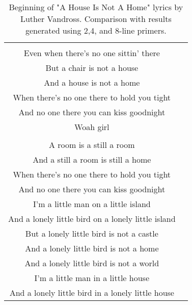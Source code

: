 \begin{table}[!h]
\begin{tabular}{cc}
\begin{minipage}[t]{0.47\textwidth}
	 A chair is still a chair\\
	 Even when there's no one sittin' there\\
	 But a chair is not a house\\
	 And a house is not a home\\
	 When there's no one there to hold you tight\\
	 And no one there you can kiss goodnight\\
	 Woah girl\\
	 \\
	 A room is a still a room\\
	 \color{blue} And a still a room is still a home\\
	 When there's no one there to hold you tight\\
	 And no one there you can kiss goodnight\\
	 I'm a little man on a little island\\
	 And a lonely little bird on a lonely little island\\	 
	 But a lonely little bird is not a castle\\
	 And a lonely little bird is not a home\\
	 And a lonely little bird is not a world\\
	 I'm a little man in a little house\\
	 And a lonely little bird in a lonely little house
	 \end{minipage}\\[6pt]
	\end{tabular}
	\caption{Beginning of "A House Is Not A Home" lyrics by Luther Vandross. Comparison with results generated using 2,4, and 8-line primers.}
	\label{generation_result}
\end{table}



